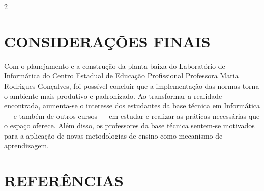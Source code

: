 \documentclass[a4paper,10pt]{article}
\begin{document}
\begin{minipage}{0.92\paperwidth}
\begin{multicols}{2}
\section*{\centering CONSIDERAÇÕES FINAIS}

Com o planejamento e a construção da planta baixa do Laboratório de Informática do Centro Estadual de Educação Profissional Professora Maria Rodrigues Gonçalves, foi possível concluir que a implementação das normas torna o ambiente mais produtivo e padronizado. Ao transformar a realidade encontrada, aumenta-se o interesse dos estudantes da base técnica em Informática — e também de outros cursos — em estudar e realizar as práticas necessárias que o espaço oferece. Além disso, os professores da base técnica sentem-se motivados para a aplicação de novas metodologias de ensino como mecanismo de aprendizagem.
\section*{\centering REFERÊNCIAS}
\renewcommand{\refname}{}


\end{multicols}
\end{minipage}
\end{document}

